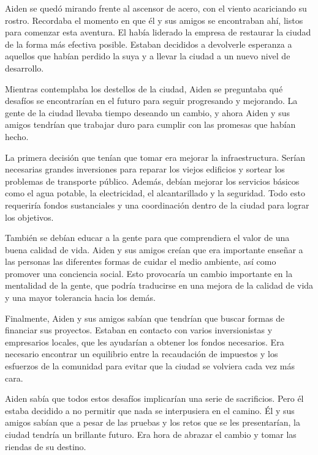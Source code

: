 

Aiden se quedó mirando frente al ascensor de acero, con el viento acariciando su rostro. Recordaba el momento en que él y sus amigos se encontraban ahí, listos para comenzar esta aventura. El había liderado la empresa de restaurar la ciudad de la forma más efectiva posible. Estaban decididos a devolverle esperanza a aquellos que habían perdido la suya y a llevar la ciudad a un nuevo nivel de desarrollo.

Mientras contemplaba los destellos de la ciudad, Aiden se preguntaba qué desafíos se encontrarían en el futuro para seguir progresando y mejorando. La gente de la ciudad llevaba tiempo deseando un cambio, y ahora Aiden y sus amigos tendrían que trabajar duro para cumplir con las promesas que habían hecho.

La primera decisión que tenían que tomar era mejorar la infraestructura. Serían necesarias grandes inversiones para reparar los viejos edificios y sortear los problemas de transporte público. Además, debían mejorar los servicios básicos como el agua potable, la electricidad, el alcantarillado y la seguridad. Todo esto requeriría fondos sustanciales y una coordinación dentro de la ciudad para lograr los objetivos.

También se debían educar a la gente para que comprendiera el valor de una buena calidad de vida. Aiden y sus amigos creían que era importante enseñar a las personas las diferentes formas de cuidar el medio ambiente, así como promover una conciencia social. Esto provocaría un cambio importante en la mentalidad de la gente, que podría traducirse en una mejora de la calidad de vida y una mayor tolerancia hacia los demás.

Finalmente, Aiden y sus amigos sabían que tendrían que buscar formas de financiar sus proyectos. Estaban en contacto con varios inversionistas y empresarios locales, que les ayudarían a obtener los fondos necesarios. Era necesario encontrar un equilibrio entre la recaudación de impuestos y los esfuerzos de la comunidad para evitar que la ciudad se volviera cada vez más cara.

Aiden sabía que todos estos desafíos implicarían una serie de sacrificios. Pero él estaba decidido a no permitir que nada se interpusiera en el camino. Él y sus amigos sabían que a pesar de las pruebas y los retos que se les presentarían, la ciudad tendría un brillante futuro. Era hora de abrazar el cambio y tomar las riendas de su destino.